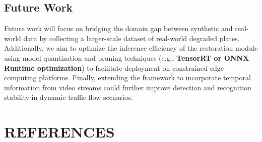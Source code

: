 \documentclass[a4paper,11pt,twocolumn]{article}
\begin{document}
	\subsection{Future Work}
	Future work will focus on bridging the domain gap between synthetic and real-world data by collecting a larger-scale dataset of real-world degraded plates. Additionally, we aim to optimize the inference efficiency of the restoration module using model quantization and pruning techniques (e.g., \textbf{TensorRT or ONNX Runtime optimization}) to facilitate deployment on constrained edge computing platforms. Finally, extending the framework to incorporate temporal information from video streams could further improve detection and recognition stability in dynamic traffic flow scenarios.
	
	\section{REFERENCES}	
	\begingroup
	\renewcommand{\section}[2]{}  
	
	
	\endgroup
\end{document}
